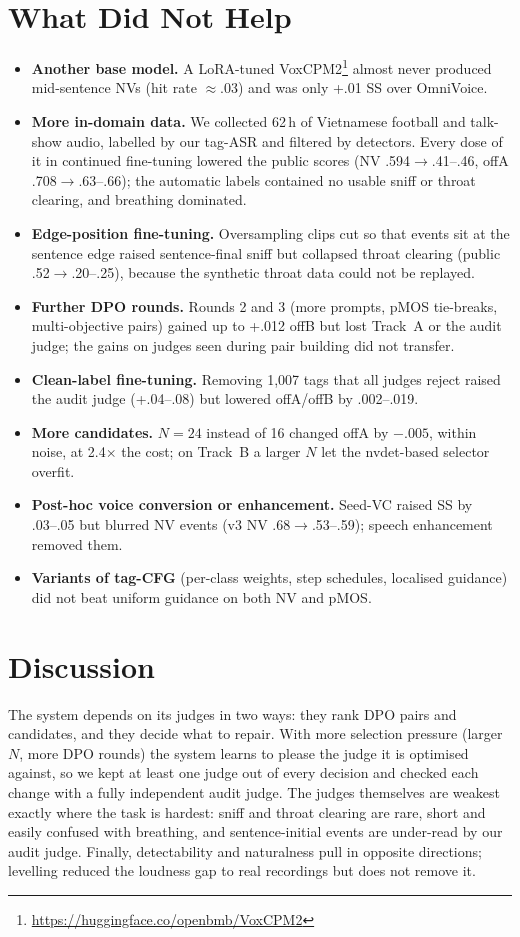 \documentclass[11pt]{article}
\begin{document}
\section{What Did Not Help}
\label{sec:negative}
\begin{itemize}\itemsep0pt
\item \textbf{Another base model.} A LoRA-tuned VoxCPM2\footnote{\url{https://huggingface.co/openbmb/VoxCPM2}} almost never produced mid-sentence NVs (hit rate $\approx$.03) and
was only +.01 SS over OmniVoice.
\item \textbf{More in-domain data.} We collected 62\,h of Vietnamese football and talk-show audio, labelled by our
tag-ASR and filtered by detectors. Every dose of it in continued fine-tuning lowered the public scores (NV .594$\rightarrow$.41--.46,
offA .708$\rightarrow$.63--.66); the automatic labels contained no usable sniff or throat clearing, and breathing dominated.
\item \textbf{Edge-position fine-tuning.} Oversampling clips cut so that events sit at the sentence edge raised
sentence-final sniff but collapsed throat clearing (public .52$\rightarrow$.20--.25), because the synthetic throat data
could not be replayed.
\item \textbf{Further DPO rounds.} Rounds 2 and 3 (more prompts, pMOS tie-breaks, multi-objective pairs) gained up to
+.012 offB but lost Track~A or the audit judge; the gains on judges seen during pair building did not transfer.
\item \textbf{Clean-label fine-tuning.} Removing 1{,}007 tags that all judges reject raised the audit judge (+.04--.08)
but lowered offA/offB by .002--.019.
\item \textbf{More candidates.} $N{=}24$ instead of 16 changed offA by $-.005$, within noise, at 2.4$\times$ the cost; on
Track~B a larger $N$ let the nvdet-based selector overfit.
\item \textbf{Post-hoc voice conversion or enhancement.} Seed-VC raised SS by .03--.05 but blurred NV events (v3 NV
.68$\rightarrow$.53--.59); speech enhancement removed them.
\item \textbf{Variants of tag-CFG} (per-class weights, step schedules, localised guidance) did not beat uniform guidance
on both NV and pMOS.
\end{itemize}

\section{Discussion}
The system depends on its judges in two ways: they rank DPO pairs and candidates, and they decide what to repair. With
more selection pressure (larger $N$, more DPO rounds) the system learns to please the judge it is optimised against, so
we kept at least one judge out of every decision and checked each change with a fully independent audit judge. The
judges themselves are weakest exactly where the task is hardest: sniff and throat clearing are rare, short and easily
confused with breathing, and sentence-initial events are under-read by our audit judge. Finally, detectability and
naturalness pull in opposite directions; levelling reduced the loudness gap to real recordings but does not remove it.
\end{document}
